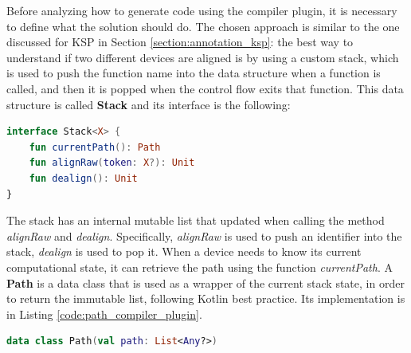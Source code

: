 Before analyzing how to generate code using the compiler plugin, it is necessary to define what the solution should do.\newline
The chosen approach is similar to the one discussed for KSP in Section \ref{section:annotation_ksp}: the best way to understand if two different devices are aligned is by using a custom stack, which is used to push the function name into the data structure when a function is called, and then it is popped when the control flow exits that function.\newline
This data structure is called \textbf{Stack} and its interface is the following:
\begin{lstlisting}[caption={Stack interface for Kotlin compiler plugin solution}, captionpos=b, language=Kotlin, label={code:stack_interface_compiler_plugin}]
interface Stack<X> {
    fun currentPath(): Path
    fun alignRaw(token: X?): Unit
    fun dealign(): Unit
}
\end{lstlisting}
The stack has an internal mutable list that updated when calling the method \textit{alignRaw} and \textit{dealign}. Specifically, \textit{alignRaw} is used to push an identifier into the stack, \textit{dealign} is used to pop it.\newline
When a device needs to know its current computational state, it can retrieve the path using the function \textit{currentPath}. A \textbf{Path} is a data class that is used as a wrapper of the current stack state, in order to return the immutable list, following Kotlin best practice. Its implementation is in Listing \ref{code:path_compiler_plugin}.
\begin{lstlisting}[caption={Path dataclass for Kotlin compiler plugin solution}, captionpos=b, language=Kotlin, label={code:path_compiler_plugin}]
data class Path(val path: List<Any?>)
\end{lstlisting}

